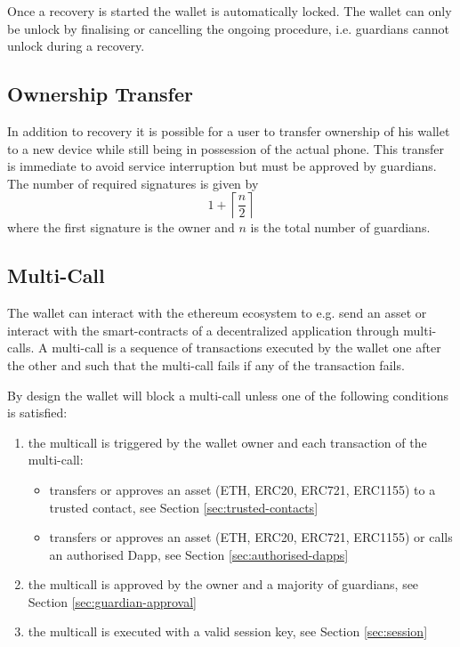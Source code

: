 \documentclass[12pt]{article}
\begin{document}
Once a recovery is started the wallet is automatically locked. The wallet can only be unlock by finalising or cancelling the ongoing procedure, i.e. guardians cannot unlock during a recovery.

\subsection{Ownership Transfer}

In addition to recovery it is possible for a user to transfer ownership of his wallet to a new device while still being in possession of the actual phone. This transfer is immediate to avoid service interruption but must be approved by guardians. The number of required signatures is given by
\begin{equation*}
    1+\left\lceil {\frac{n}{2}} \right\rceil
\end{equation*}
where the first signature is the owner and $n$ is the total number of guardians.

\subsection{Multi-Call}

The wallet can interact with the ethereum ecosystem to e.g. send an asset or interact with the smart-contracts of a decentralized application through multi-calls. A multi-call is a sequence of transactions executed by the wallet one after the other and such that the multi-call fails if any of the transaction fails.

By design the wallet will block a multi-call unless one of the following conditions is satisfied:
\begin{enumerate}
    \item the multicall is triggered by the wallet owner and each transaction of the multi-call:
    \begin{itemize}
        \item transfers or approves an asset (ETH, ERC20, ERC721, ERC1155) to a trusted contact, see Section \ref{sec:trusted-contacts}
        \item transfers or approves an asset (ETH, ERC20, ERC721, ERC1155) or calls an authorised Dapp, see Section \ref{sec:authorised-dapps}
    \end{itemize}
    \item the multicall is approved by the owner and a majority of guardians, see Section \ref{sec:guardian-approval} 
    \item the multicall is executed with a valid session key, see Section \ref{sec:session}
\end{enumerate}
\end{document}
